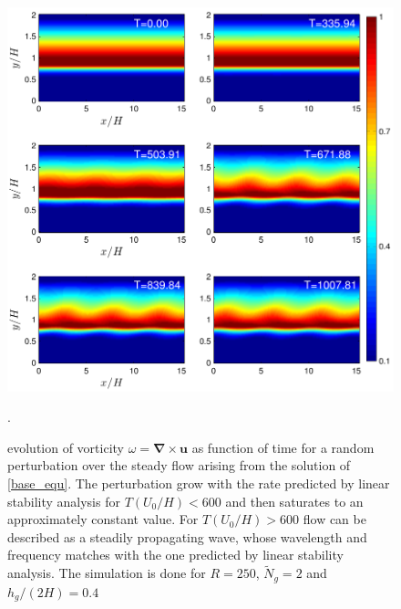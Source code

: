 \documentclass[12pt]{report}   %
\newcommand{\bu}{\mathbf{u}}
\newcommand{\grad}{\mathbf{\nabla}}
\newcommand{\Ndg}{\tilde{N}_g}
\begin{document}
\begin{figure}
 \centerline{\includegraphics[scale=1.3]{VorticityColor}}
 \caption{ evolution of vorticity $\omega = \grad \times \bu$ as function of time for a random perturbation over the steady flow arising from the solution of \eqref{base_equ}. The perturbation grow with the rate predicted by linear stability analysis for $T(U_0/H)<600$ and then saturates to an approximately constant value. For $T(U_0/H) >600$ flow can be described as a steadily propagating wave, whose wavelength and frequency matches with the one predicted by linear stability analysis. The simulation is done for $R=250$, $\Ndg=2$ and $h_g/(2H)=0.4$ }. 
\label{VorticityColor}
 \end{figure}
\end{document}
